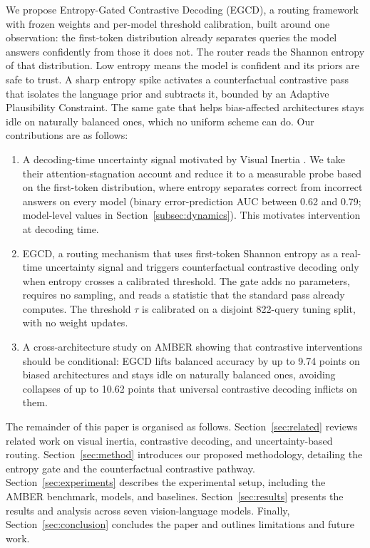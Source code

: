 \documentclass[pdflatex,sn-basic,Numbered]{sn-jnl}
\theoremstyle{thmstyleone}
\theoremstyle{thmstyletwo}
\theoremstyle{thmstylethree}
\begin{document}
We propose Entropy-Gated Contrastive Decoding (EGCD), a routing framework with frozen weights and per-model threshold calibration, built around one observation: the first-token distribution already separates queries the model answers confidently from those it does not. The router reads the Shannon entropy of that distribution. Low entropy means the model is confident and its priors are safe to trust. A sharp entropy spike activates a counterfactual contrastive pass that isolates the language prior and subtracts it, bounded by an Adaptive Plausibility Constraint. The same gate that helps bias-affected architectures stays idle on naturally balanced ones, which no uniform scheme can do. Our contributions are as follows:

\begin{enumerate}
\item A decoding-time uncertainty signal motivated by Visual Inertia \cite{gong2026attention}. We take their attention-stagnation account and reduce it to a measurable probe based on the first-token distribution, where entropy separates correct from incorrect answers on every model (binary error-prediction AUC between 0.62 and 0.79; model-level values in Section~\ref{subsec:dynamics}). This motivates intervention at decoding time.

\item EGCD, a routing mechanism that uses first-token Shannon entropy as a real-time uncertainty signal and triggers counterfactual contrastive decoding only when entropy crosses a calibrated threshold. The gate adds no parameters, requires no sampling, and reads a statistic that the standard pass already computes. The threshold $\tau$ is calibrated on a disjoint 822-query tuning split, with no weight updates.

\item A cross-architecture study on AMBER showing that contrastive interventions should be conditional: EGCD lifts balanced accuracy by up to 9.74 points on biased architectures and stays idle on naturally balanced ones, avoiding collapses of up to 10.62 points that universal contrastive decoding inflicts on them.
\end{enumerate}

The remainder of this paper is organised as follows. Section~\ref{sec:related} reviews related work on visual inertia, contrastive decoding, and uncertainty-based routing. Section~\ref{sec:method} introduces our proposed methodology, detailing the entropy gate and the counterfactual contrastive pathway. Section~\ref{sec:experiments} describes the experimental setup, including the AMBER benchmark, models, and baselines. Section~\ref{sec:results} presents the results and analysis across seven vision-language models. Finally, Section~\ref{sec:conclusion} concludes the paper and outlines limitations and future work.
\end{document}
